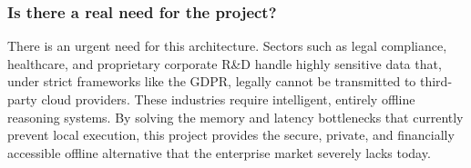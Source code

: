 \subsubsection{Is there a real need for the project?}
\label{subsubsec:real-need-project}

There is an urgent need for this architecture. Sectors such as legal compliance, healthcare, and proprietary corporate R\&D handle highly sensitive data that, under strict frameworks like the GDPR, legally cannot be transmitted to third-party cloud providers. These industries require intelligent, entirely offline reasoning systems. By solving the memory and latency bottlenecks that currently prevent local execution, this project provides the secure, private, and financially accessible offline alternative that the enterprise market severely lacks today.